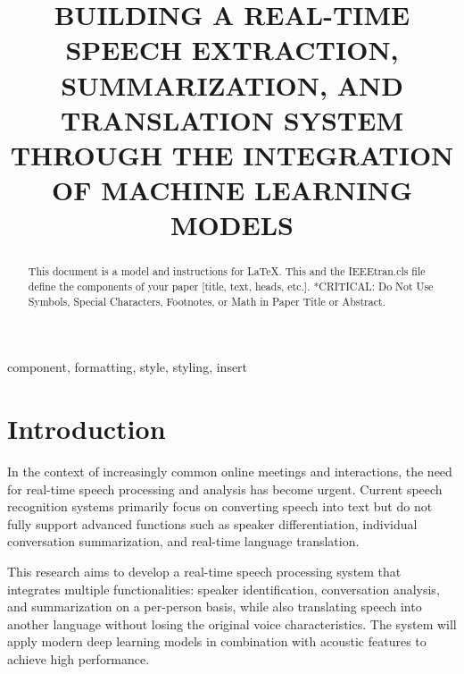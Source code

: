 \documentclass[conference]{IEEEtran}
\begin{document}
\title{BUILDING A REAL-TIME SPEECH EXTRACTION, SUMMARIZATION, AND TRANSLATION SYSTEM THROUGH THE INTEGRATION OF MACHINE LEARNING MODELS\\
}

\author{
    \and
}

\maketitle

\begin{abstract}
    This document is a model and instructions for \LaTeX.
    This and the IEEEtran.cls file define the components of your paper [title, text, heads, etc.]. *CRITICAL: Do Not Use Symbols, Special Characters, Footnotes,
    or Math in Paper Title or Abstract.
\end{abstract}

\begin{IEEEkeywords}
    component, formatting, style, styling, insert
\end{IEEEkeywords}

\section{Introduction}
In the context of increasingly common online meetings and interactions, the need for real-time speech processing and analysis has become urgent. Current speech recognition systems primarily focus on converting speech into text but do not fully support advanced functions such as speaker differentiation, individual conversation summarization, and real-time language translation.

This research aims to develop a real-time speech processing system that integrates multiple functionalities: speaker identification, conversation analysis, and summarization on a per-person basis, while also translating speech into another language without losing the original voice characteristics. The system will apply modern deep learning models in combination with acoustic features to achieve high performance.
\end{document}

